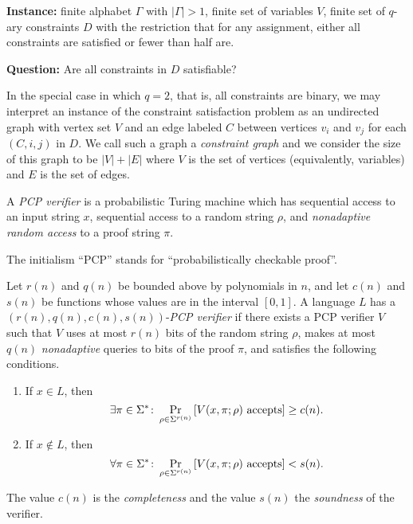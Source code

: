 \documentclass{article}
\begin{document}
\begin{definition}
  \mbox{}

  \textbf{Instance:} finite alphabet $\Gamma$ with $|\Gamma| > 1$, finite set of variables $V$, finite set of $q$-ary constraints $D$ with the restriction that for any assignment, either all constraints are satisfied or fewer than half are.

  \textbf{Question:} Are all constraints in $D$ satisfiable?
\end{definition}

In the special case in which $q = 2$, that is, all constraints are binary, we may interpret an instance of the constraint satisfaction problem as an undirected graph with vertex set $V$ and an edge labeled $C$ between vertices $v_i$ and $v_j$ for each $(C, i, j)$ in $D$.
We call such a graph a \emph{constraint graph} and we consider the size of this graph to be $|V| + |E|$ where $V$ is the set of vertices (equivalently, variables) and $E$ is the set of edges.

\begin{definition}
  A \emph{PCP verifier} is a probabilistic Turing machine which has sequential access to an input string $x$, sequential access to a random string $\rho$, and \emph{nonadaptive random access} to a proof string $\pi$.
\end{definition}

The initialism ``PCP'' stands for ``probabilistically checkable proof''.

\begin{definition}
  Let $r(n)$ and $q(n)$ be bounded above by polynomials in $n$, and let $c(n)$ and $s(n)$ be functions whose values are in the interval $[0, 1]$.
  A language $L$ has a $(r(n), q(n), c(n), s(n))$-\emph{PCP verifier} if there exists a PCP verifier $V$ such that $V$ uses at most $r(n)$ bits of the random string $\rho$, makes at most $q(n)$ \emph{nonadaptive} queries to bits of the proof $\pi$, and satisfies the following conditions.
  \begin{enumerate}
  \item If $x \in L$, then
    \begin{equation*}
      \exists \pi \in \Sigma^* \colon \Pr_{\rho \in \Sigma^{r(n)}}{\left[V(x, \pi; \rho) \textnormal{ accepts}\right]} \geq c(n).
    \end{equation*}
  \item If $x \notin L$, then
    \begin{equation*}
      \forall \pi \in \Sigma^* \colon \Pr_{\rho \in \Sigma^{r(n)}}{\left[V(x, \pi; \rho) \textnormal{ accepts}\right]} < s(n).
    \end{equation*}
  \end{enumerate}
  The value $c(n)$ is the \emph{completeness} and the value $s(n)$ the \emph{soundness} of the verifier.
\end{definition}
\end{document}
